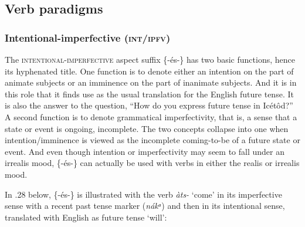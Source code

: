\subsection{Verb paradigms}
\subsubsection{Intentional-imperfective (\textsc{int/ipfv})}

The \textsc{intentional-imperfective} aspect suffix \{-és-\} has two basic functions, hence its hyphenated title. One function is to denote either an intention on the part of animate subjects or an imminence on the part of inanimate subjects. And it is in this role that it finds use as the usual translation for the English future tense. It is also the answer to the question, “How do you express future tense in Icétôd?” A second function is to denote grammatical imperfectivity, that is, a sense that a state or event is ongoing, incomplete. The two concepts collapse into one when intention/imminence is viewed as the incomplete coming-to-be of a future state or event.  And even though intention or imperfectivity may seem to fall under an irrealis mood, \{-és-\} can actually be used with verbs in either the realis or irrealis mood. 

In .28 below, \{-és-\} is illustrated with the verb \textit{àts-} ‘come’ in its imperfective sense with a recent past tense marker (\textit{nákᵃ}) and then in its intentional sense, translated with English as future tense ‘will’:



